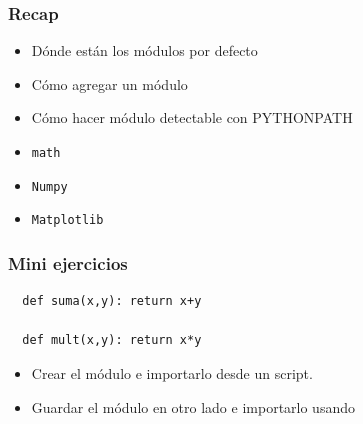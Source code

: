 \documentclass[14pt,aspectratio=169,xcolor=dvipsnames]{beamer}
\begin{document}
\begin{frame}\frametitle{Recap}
    \begin{itemize}
        \item Dónde están los módulos por defecto
        \item Cómo agregar un módulo
        \item Cómo hacer módulo detectable con PYTHONPATH
        \item \texttt{math}
        \item \texttt{Numpy}
        \item \texttt{Matplotlib}
    \end{itemize}
\end{frame}
\begin{frame}
    \maketitle
\end{frame}
\begin{frame}[fragile]\frametitle{Mini ejercicios}
    \begin{verbatim}
  def suma(x,y): return x+y

  def mult(x,y): return x*y
    \end{verbatim}

    \begin{itemize}
        \item Crear el módulo  e importarlo desde un script.
        \item Guardar el módulo en otro lado e importarlo usando 
    \end{itemize}

\end{frame}
\end{document}

